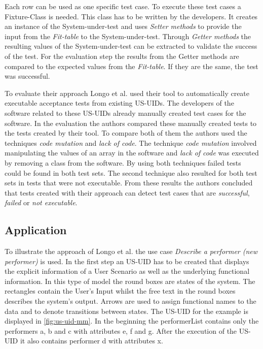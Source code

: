 Each row can be used as one specific test case.
To execute these test cases a Fixture-Class is needed.
This class has to be written by the developers.
It creates an instance of the System-under-test and uses \textit{Setter methods} to provide the input from the \textit{Fit-table} to the System-under-test.
Through \textit{Getter methods} the resulting values of the System-under-test can be extracted to validate the success of the test.
For the evaluation step the results from the Getter methods are compared to the expected values from the \textit{Fit-table}.
If they are the same, the test was successful.

To evaluate their approach Longo et al. used their tool to automatically create executable acceptance tests from existing US-UIDs.
The developers of the software related to these US-UIDs already manually created test cases for the software.
In the evaluation the authors compared these manually created tests to the tests created by their tool.
To compare both of them the authors used the techniques \textit{code mutation} and \textit{lack of code}.
The technique \textit{code mutation} involved manipulating the values of an array in the software and \textit{lack of code} was executed by removing a class from the software.
By using both techniques failed tests could be found in both test sets.
The second technique also resulted for both test sets in tests that were not executable.
From these results the authors concluded that tests created with their approach can detect test cases that are \textit{successful}, \textit{failed} or \textit{not executable}.

\subsection{Application}

To illustrate the approach of Longo et al. the use case \textit{Describe a performer (new performer)} is used.
In the first step an US-UID has to be created that displays the explicit information of a User Scenario as well as the underlying functional information.
In this type of model the round boxes are states of the system.
The rectangles contain the User's Input whilst the free text in the round boxes describes the system's output.
Arrows are used to assign functional names to the data and to denote transitions between states.
The US-UID for the example is displayed in \autoref{fig:us-uid-mm}.
In the beginning the performerList contains only the performers a, b and c with attributes e, f and g.
After the execution of the US-UID it also contains performer d with attributes x.


